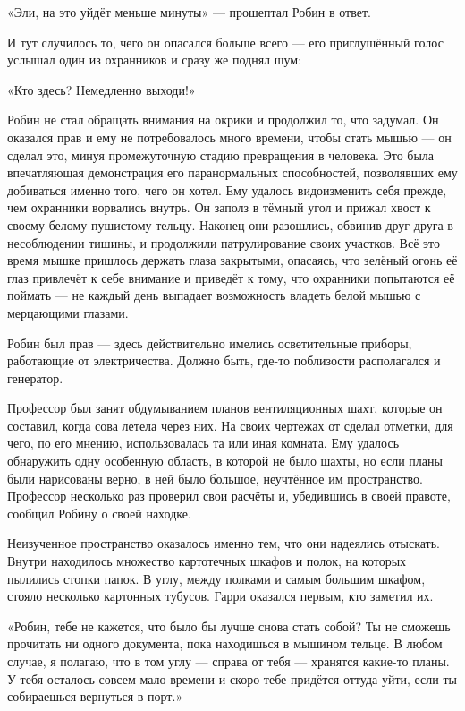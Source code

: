 \documentclass[a5paper, 9pt,
final, openany, twoside=true]{memoir}
\begin{document}
«Эли, на это уйдёт меньше минуты» — прошептал Робин в ответ.

И тут случилось то, чего он опасался больше всего — его приглушённый голос услышал один из охранников и сразу же поднял шум:

«Кто здесь? Немедленно выходи!»

Робин не стал обращать внимания на окрики и продолжил то, что задумал. Он оказался прав и ему не потребовалось много времени, чтобы стать мышью — он сделал это, минуя промежуточную стадию превращения в человека. Это была впечатляющая демонстрация его паранормальных способностей, позволявших ему добиваться именно того, чего он хотел. Ему удалось видоизменить себя прежде, чем охранники ворвались внутрь. Он заполз в тёмный угол и прижал хвост к своему белому пушистому тельцу. Наконец они разошлись, обвинив друг друга в несоблюдении тишины, и продолжили патрулирование своих участков. Всё это время мышке пришлось держать глаза закрытыми, опасаясь, что зелёный огонь её глаз привлечёт к себе внимание и приведёт к тому, что охранники попытаются её поймать — не каждый день выпадает возможность владеть белой мышью с мерцающими глазами.

Робин был прав — здесь действительно имелись осветительные приборы, работающие от электричества. Должно быть, где-то поблизости располагался и генератор.\bigskip

Профессор был занят обдумыванием планов вентиляционных шахт, которые он составил, когда сова летела через них. На своих чертежах от сделал отметки, для чего, по его мнению, использовалась та или иная комната. Ему удалось обнаружить одну особенную область, в которой не было шахты, но если планы были нарисованы верно, в ней было большое, неучтённое им пространство. Профессор несколько раз проверил свои расчёты и, убедившись в своей правоте, сообщил Робину о своей находке.\bigskip

Неизученное пространство оказалось именно тем, что они надеялись отыскать. Внутри находилось множество картотечных шкафов и полок, на которых пылились стопки папок. В углу, между полками и самым большим шкафом, стояло несколько картонных тубусов. Гарри оказался первым, кто заметил их.

«Робин, тебе не кажется, что было бы лучше снова стать собой? Ты не сможешь прочитать ни одного документа, пока находишься в мышином тельце. В любом случае, я полагаю, что в том углу — справа от тебя — хранятся какие-то планы. У тебя осталось совсем мало времени и скоро тебе придётся оттуда уйти, если ты собираешься вернуться в порт.»
\end{document}
